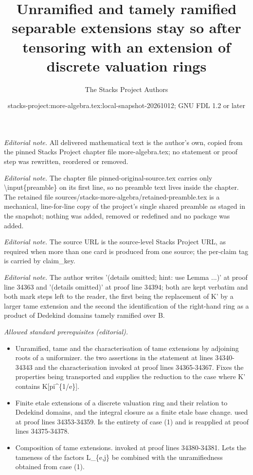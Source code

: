 \documentclass[10pt,a4paper]{amsart}
\title{Unramified and tamely ramified separable extensions stay so after tensoring with an extension of discrete valuation rings}
\author{The Stacks Project Authors}
\date{stacks-project:more-algebra.tex:local-snapshot-20261012; GNU FDL 1.2 or later}
\theoremstyle{plain}
\theoremstyle{definition}
\theoremstyle{remark}
\numberwithin{equation}{subsection}
\begin{document}
\maketitle
\setcounter{subsection}{1}
\noindent\textit{Editorial note.} All delivered mathematical text is the author's own, copied from the pinned Stacks Project chapter file more-algebra.tex; no statement or proof step was rewritten, reordered or removed.\par\medskip
\noindent\textit{Editorial note.} The chapter file pinned-original-source.tex carries only \textbackslash{}input\{preamble\} on its first line, so no preamble text lives inside the chapter. The retained file sources/stacks-more-algebra/retained-preamble.tex is a mechanical, line-for-line copy of the project's single shared preamble as staged in the snapshot; nothing was added, removed or redefined and no package was added.\par\medskip
\noindent\textit{Editorial note.} The source URL is the source-level Stacks Project URL, as required when more than one card is produced from one source; the per-claim tag is carried by claim\_key.\par\medskip
\noindent\textit{Editorial note.} The author writes '(details omitted; hint: use Lemma ...)' at proof line 34363 and '(details omitted)' at proof line 34394; both are kept verbatim and both mark steps left to the reader, the first being the replacement of K' by a larger tame extension and the second the identification of the right-hand ring as a product of Dedekind domains tamely ramified over B.\par\medskip
\noindent\textit{Allowed standard prerequisites (editorial).}\begin{itemize}
\item Unramified, tame and the characterisation of tame extensions by adjoining roots of a uniformizer. the two assertions in the statement at lines 34340-34343 and the characterisation invoked at proof lines 34365-34367. Fixes the properties being transported and supplies the reduction to the case where K' contains K[pi\textasciicircum{}\{1/e\}].
\item Finite etale extensions of a discrete valuation ring and their relation to Dedekind domains, and the integral closure as a finite etale base change. used at proof lines 34353-34359. Is the entirety of case (1) and is reapplied at proof lines 34375-34378.
\item Composition of tame extensions. invoked at proof lines 34380-34381. Lets the tameness of the factors L\_\{e,j\} be combined with the unramifiedness obtained from case (1).
\end{itemize}\medskip
\end{document}
